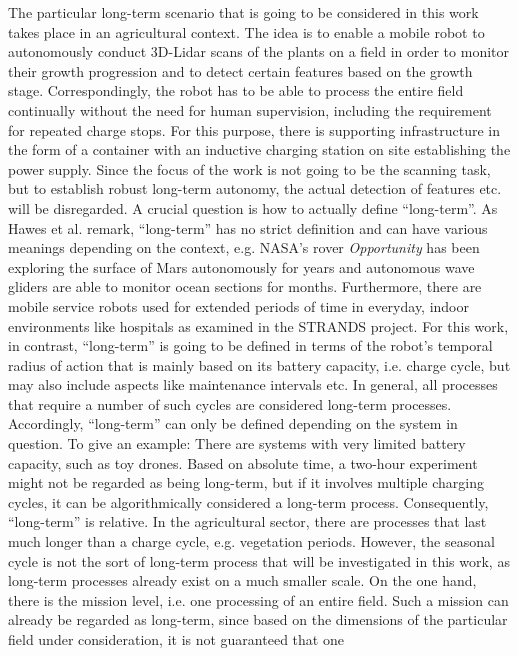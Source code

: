\documentclass[english, master, expose, utf8]{base/thesis_KBS}
\begin{document}
The particular long-term scenario that is going to be considered in this work takes place in an agricultural context.
The idea is to enable a mobile robot to autonomously conduct 3D-Lidar scans of the plants on a field in order to monitor their growth progression and 
to detect certain features based on the growth stage. Correspondingly, the robot has to be able to process the entire field continually without the need for human supervision,
including the requirement for repeated charge stops. For this purpose, there is supporting infrastructure in the form of a container with an inductive charging station on site
establishing the power supply. Since the focus of the work is not going to be the scanning task, but to establish robust long-term autonomy, the actual detection of features 
etc. will be disregarded.
A crucial question is how to actually define ``long-term''. As Hawes et al. remark, ``long-term'' has no strict definition and can have various meanings depending
on the context, e.g. NASA's rover \textit{Opportunity} has been exploring the surface of Mars autonomously for years and autonomous wave gliders are able to monitor
ocean sections for months. Furthermore, there are mobile service robots used for extended periods of time in everyday, indoor environments like hospitals 
as examined in the STRANDS project. \cite{Hawes:2017}
For this work, in contrast, ``long-term'' is going to be defined in terms of the robot's temporal radius of action that is mainly based on its battery capacity, i.e. charge cycle,
but may also include aspects like maintenance intervals etc. In general, all processes that require a number of such cycles are considered long-term processes.
Accordingly, ``long-term'' can only be defined depending on the system in question. To give an example: There are systems with very limited battery capacity, 
such as toy drones. Based on absolute time, a two-hour experiment might not be regarded as being long-term, but if it involves multiple charging cycles, it can be 
algorithmically considered a long-term process. Consequently, ``long-term'' is relative.\newline
In the agricultural sector, there are processes that last much longer than a charge cycle, e.g. vegetation periods.
However, the seasonal cycle is not the sort of long-term process that will be investigated in this work, as long-term processes already exist on a much smaller scale.
On the one hand, there is the mission level, i.e. one processing of an entire field. 
Such a mission can already be regarded as long-term, since based on the dimensions of the particular field under consideration, it is not guaranteed that one
\end{document}
